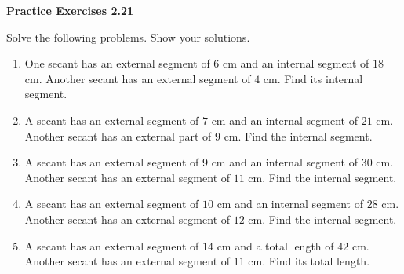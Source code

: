 \vspace{0.3ex}
\noindent\textbf{Practice Exercises 2.21}

\vspace{0.2ex}

Solve the following problems. Show your solutions.

\begin{enumerate}
    \item One secant has an external segment of $6$ cm and an internal segment of $18$ cm. Another secant has an external segment of $4$ cm. Find its internal segment.
    \item A secant has an external segment of $7$ cm and an internal segment of $21$ cm. Another secant has an external part of $9$ cm. Find the internal segment.
    \item A secant has an external segment of $9$ cm and an internal segment of $30$ cm. Another secant has an external segment of $11$ cm. Find the internal segment.
    \item A secant has an external segment of $10$ cm and an internal segment of $28$ cm. Another secant has an external segment of $12$ cm. Find the internal segment.
    \item A secant has an external segment of $14$ cm and a total length of $42$ cm. Another secant has an external segment of $11$ cm. Find its total length.
\end{enumerate}

